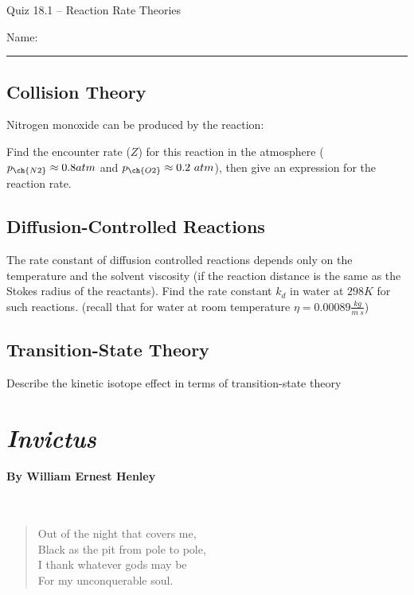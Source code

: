 \documentclass[11pt, letterpaper]{memoir}
\begin{document}
	\begin{center}
		{\large Quiz 18.1 -- Reaction Rate Theories}
	\end{center}
	{\large Name: \rule[-1mm]{4in}{.1pt} 

\subsection*{Collision Theory}
Nitrogen monoxide can be produced by the reaction:


\noindent Find the encounter rate ($Z$) for this reaction in the atmosphere ($p_{\ch{N2}}\approx0.8atm$ and $p_{\ch{O2}}\approx0.2~atm$), then give an expression for the reaction rate.

\vspace{12em}
\subsection*{Diffusion-Controlled Reactions}
 The rate constant of diffusion controlled reactions depends only on the temperature and the solvent viscosity (if the reaction distance is the same as the Stokes radius of the reactants). Find the rate constant $k_d$ in water at $298K$ for such reactions. (recall that for water at room temperature  $\eta=0.00089\frac{kg}{m~s}$)
 
 
 \vspace{10em}
\subsection*{Transition-State Theory}
Describe the kinetic isotope effect in terms of transition-state theory

\newpage
\pagestyle{empty}
\addtocounter{page}{-1}	
\section*{\emph{Invictus}}
\paragraph{By William Ernest Henley}~
\begin{verse}
	Out of the night that covers me,\\
	\hspace{1em}Black as the pit from pole to pole,\\
	I thank whatever gods may be\\
	\hspace{1em}For my unconquerable soul.
	

\end{verse}}
\end{document}
